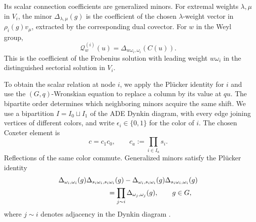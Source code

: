 \documentclass[11pt,leqno]{amsart}
\numberwithin{equation}{section}
\theoremstyle{plain}
\theoremstyle{definition}
\theoremstyle{plain}
\theoremstyle{definition}
\theoremstyle{remark}
\begin{document}
Its scalar connection coefficients are generalized minors.  For extremal weights $\lambda,\mu$ in $V_i$, the minor $\Delta_{\lambda,\mu}(g)$ is the coefficient of the chosen $\lambda$-weight vector in $\rho_i(g)v_\mu$, extracted by the corresponding dual covector.  For $w$ in the Weyl group,
\begin{equation}\label{eq:intro-Q-as-defined-coefficient}
 \mathcal Q_w^{(i)}(u)
 =\Delta_{w\omega_i,\omega_i}(C(u)).
\end{equation}
This is the coefficient of the Frobenius solution with leading weight $w\omega_i$ in the distinguished sectorial solution in $V_i$.

To obtain the scalar relation at node $i$, we apply the Pl\"ucker identity for $i$ and use the $(G,q)$-Wronskian equation to replace a column by its value at $qu$.  The bipartite order determines which neighboring minors acquire the same shift.  We use a bipartition $I=I_0\sqcup I_1$ of the ADE Dynkin diagram, with every edge joining vertices of different colors, and write $\epsilon_i\in\{0,1\}$ for the color of $i$.  The chosen Coxeter element is
\[
 c=c_1c_0,\qquad c_a:=\prod_{i\in I_a}s_i.
\]
Reflections of the same color commute.  Generalized minors satisfy the Pl\"ucker identity
\[
 \begin{aligned}
 &\Delta_{\omega_i,\omega_i}(g)
       \Delta_{s_i\omega_i,s_i\omega_i}(g)
 -\Delta_{\omega_i,s_i\omega_i}(g)
       \Delta_{s_i\omega_i,\omega_i}(g)\\
 &\hspace{25mm}=\prod_{j\sim i}\Delta_{\omega_j,\omega_j}(g),
 \qquad g\in G,
 \end{aligned}
\]
where $j\sim i$ denotes adjacency in the Dynkin diagram \cite{FominZelevinsky1999,KZ2021}.
\end{document}
